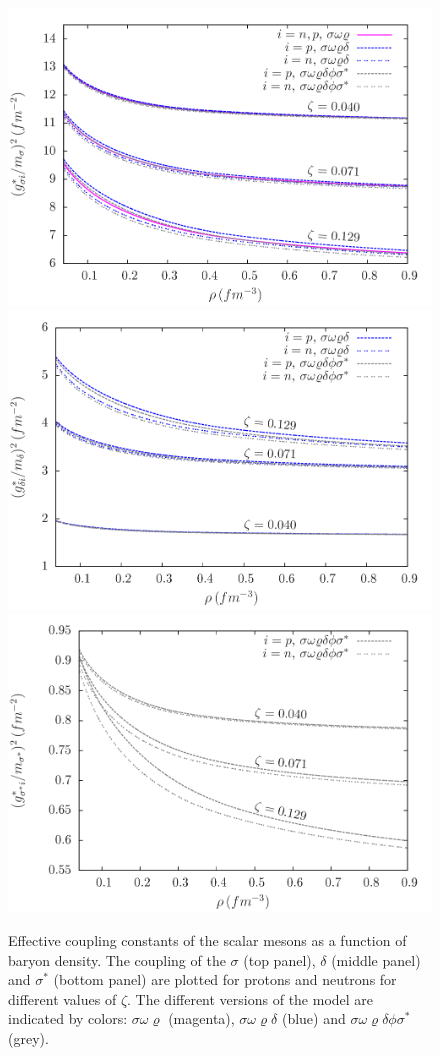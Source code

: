 \documentclass[twocolumn,showpacs,aps]{revtex4}
\begin{document}
\begin{figure}
\centering
 \includegraphics[width=9.cm]{geff_sigma_paper.png}
     \centering
 \includegraphics[width=9.cm]{geff_delta_paper.png}
 \includegraphics[width=9.cm]{geff_sigmas_paper.png}
     \caption{Effective coupling constants of the scalar mesons as a function of baryon density.
     The coupling of the $\sigma$ (top panel), $\delta$ (middle panel) and $\sigma^*$ (bottom panel) are plotted
     for protons and neutrons for different values of $\zeta$. The different versions of the model are indicated by colors: 
     $\sigma\omega\varrho$ (magenta), $\sigma\omega\varrho\delta$ (blue) and $\sigma\omega\varrho\delta\phi\sigma^*$ (grey).} \label{geff_rho}
\end{figure}
\end{document}
